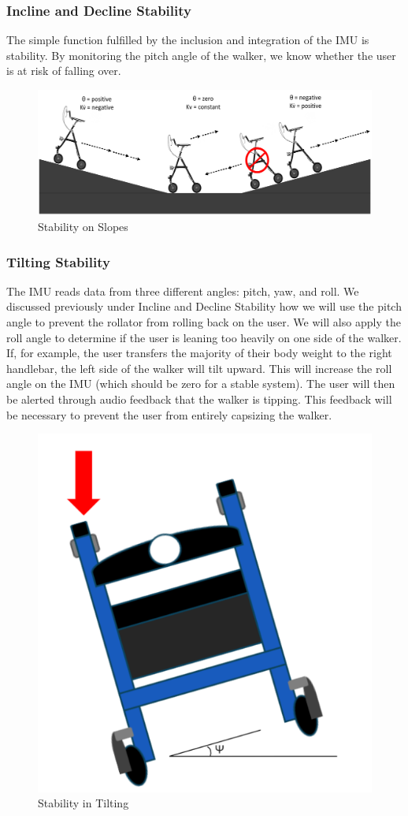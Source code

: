 \subsubsection{Incline and Decline Stability}
\noindent The simple function fulfilled by the inclusion and integration of the IMU is stability. By monitoring the pitch angle of the walker, we know whether the user is at risk of falling over.\\

\begin{figure}[H]
	\centering
	\includegraphics[width=\textwidth]{./Images/Incline-Decline-Stability.png}
	\caption{\label{fig:slope-stability}Stability on Slopes}
\end{figure}

\subsubsection{Tilting Stability}
\noindent The IMU reads data from three different angles: pitch, yaw, and roll. We discussed previously under Incline and Decline Stability how we will use the pitch angle to prevent the rollator from rolling back on the user. We will also apply the roll angle to determine if the user is leaning too heavily on one side of the walker. If, for example, the user transfers the majority of their body weight to the right handlebar, the left side of the walker will tilt upward. This will increase the roll angle on the IMU (which should be zero for a stable system). The user will then be alerted through audio feedback that the walker is tipping. This feedback will be necessary to prevent the user from entirely capsizing the walker.\\

\begin{figure}[H]
	\centering
	\includegraphics[width=.4\textwidth]{./Images/roll2.png}
	\caption{\label{fig:roll}Stability in Tilting}
\end{figure}

